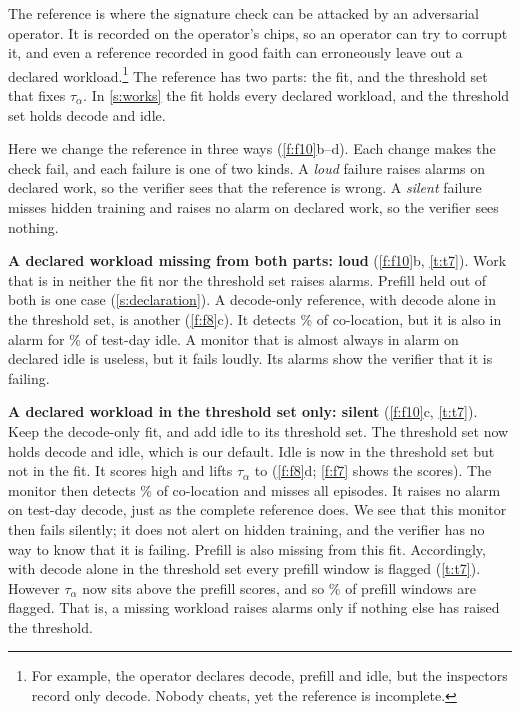 The reference is where the signature check can be attacked by an adversarial operator. It is recorded on the
operator's chips, so an operator can try to corrupt it, and even a reference recorded in good
faith can erroneously leave out a declared workload.\footnote{For example, the operator
declares decode, prefill and idle, but the inspectors record only decode. Nobody cheats,
yet the reference is incomplete.} The reference has two parts: the fit, and the threshold set
that fixes $\tau_\alpha$. In \cref{s:works} the fit holds every declared workload, and
the threshold set holds decode and idle.

Here we change the reference in three ways (\cref{f:f10}b--d). Each
change makes the check fail, and each failure is one of two kinds. A \emph{loud} failure
raises alarms on declared work, so the verifier sees that the reference is wrong. A
\emph{silent} failure misses hidden training and raises no alarm on declared work, so
the verifier sees nothing.

\textbf{A declared workload missing from both parts: loud} (\cref{f:f10}b,
\cref{t:t7}). Work that is in neither the fit nor the threshold set raises alarms.
Prefill held out of both is one case (\cref{s:declaration}). A decode-only reference,
with decode alone in the threshold set, is another (\cref{f:f8}c). It detects
\TfourMisCoDeclared\% of co-location, but it is also in alarm for \TfourIdleADecode\% of
test-day idle. A monitor that is almost always in alarm on declared idle is useless, but
it fails loudly. Its alarms show the verifier that it is failing.

\textbf{A declared workload in the threshold set only: silent} (\cref{f:f10}c,
\cref{t:t7}). Keep the decode-only fit, and add idle to its threshold set. The threshold set
now holds decode and idle, which is our default. Idle is now in the threshold set
but not in the fit. It scores high
and lifts $\tau_\alpha$ to \TauDecOnlyPooled{} (\cref{f:f8}d; \cref{f:f7} shows the
scores). The monitor then detects \TfourMisCoPooled\% of co-location and misses all
\EpScored{} episodes. It raises no alarm on test-day decode, just as the complete reference
does. We see that this monitor then fails silently; it does not alert on hidden training, and the verifier has no way to know that it is failing. Prefill is also missing from this fit. Accordingly, with decode alone in the threshold set every prefill window is flagged (\cref{t:t7}). However $\tau_\alpha$ now sits above the prefill scores, and so \DecOnlyPrefillPooled\% of prefill windows are flagged. That is, a missing workload raises alarms only if nothing else
has raised the threshold.

